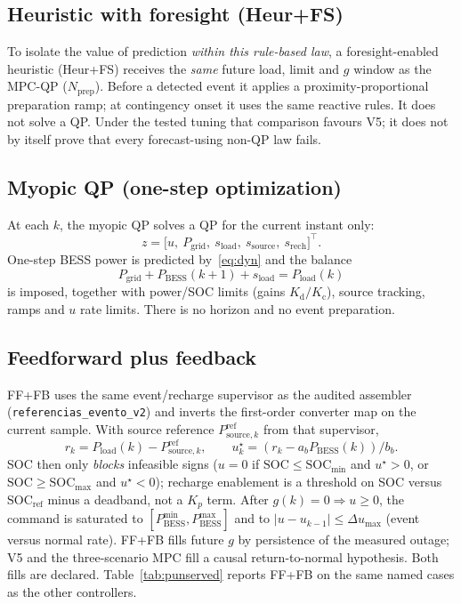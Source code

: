 \documentclass{ieeeaccess}
\begin{document}
\subsection{Heuristic with foresight (Heur+FS)}
To isolate the value of prediction \emph{within this rule-based law}, a foresight-enabled heuristic (Heur+FS) receives the \emph{same} future load, limit and $g$ window as the MPC-QP ($N_{\mathrm{prep}}$). Before a detected event it applies a proximity-proportional preparation ramp; at contingency onset it uses the same reactive rules. It does not solve a QP. Under the tested tuning that comparison favours V5; it does not by itself prove that every forecast-using non-QP law fails.

\subsection{Myopic QP (one-step optimization)}
At each $k$, the myopic QP solves a QP for the current instant only:
\begin{equation}
z=\big[u,\ P_{\mathrm{grid}},\ s_{\mathrm{load}},\ s_{\mathrm{source}},\ s_{\mathrm{rech}}\big]^\top.
\end{equation}
One-step BESS power is predicted by~\eqref{eq:dyn} and the balance
\begin{equation}
P_{\mathrm{grid}}+P_{\mathrm{BESS}}(k+1)+s_{\mathrm{load}}=P_{\mathrm{load}}(k)
\end{equation}
is imposed, together with power/SOC limits (gains $K_{\mathrm{d}}/K_{\mathrm{c}}$), source tracking, ramps and $u$ rate limits. There is no horizon and no event preparation.

\subsection{Feedforward plus feedback}
\label{sec:ff}
FF+FB uses the same event/recharge supervisor as the audited assembler (\texttt{referencias\_evento\_v2}) and inverts the first-order converter map on the current sample. With source reference $P_{\mathrm{source},k}^{\mathrm{ref}}$ from that supervisor,
\begin{equation}
r_k=P_{\mathrm{load}}(k)-P_{\mathrm{source},k}^{\mathrm{ref}},\qquad
u_k^{\star}=(r_k-a_b P_{\mathrm{BESS}}(k))/b_b.
\end{equation}
SOC then only \emph{blocks} infeasible signs ($u{=}0$ if $\mathrm{SOC}\le\mathrm{SOC}_{\min}$ and $u^{\star}{>}0$, or $\mathrm{SOC}\ge\mathrm{SOC}_{\max}$ and $u^{\star}{<}0$); recharge enablement is a threshold on SOC versus $\mathrm{SOC}_{\mathrm{ref}}$ minus a deadband, not a $K_p$ term. After $g(k){=}0\Rightarrow u\ge 0$, the command is saturated to $[P_{\mathrm{BESS}}^{\min},P_{\mathrm{BESS}}^{\max}]$ and to $|u-u_{k-1}|\le \Delta u_{\max}$ (event versus normal rate). FF+FB fills future $g$ by persistence of the measured outage; V5 and the three-scenario MPC fill a causal return-to-normal hypothesis. Both fills are declared. Table~\ref{tab:punserved} reports FF+FB on the same named cases as the other controllers.
\end{document}

